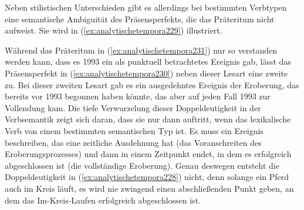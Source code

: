 Neben stilistischen Unterschieden gibt es allerdings bei bestimmten Verbtypen eine semantische Ambiguität des Präsensperfekts, die das Präteritum nicht aufweist.
Sie wird in (\ref{ex:analytischetempora229}) illustriert.


\begin{exe}
  \ex\label{ex:analytischetempora229}
  \begin{xlist}
  \end{xlist}
\end{exe}


\label{abs:analytischetempora232}Während das Präteritum in (\ref{ex:analytischetempora231}) nur so verstanden werden kann, dass es 1993 ein als punktuell betrachtetes Ereignis gab, lässt das Präsensperfekt in (\ref{ex:analytischetempora230}) neben dieser Lesart eine zweite zu.
Bei dieser zweiten Lesart gab es ein ausgedehntes Ereignis der Eroberung, das bereits vor 1993 begonnen haben könnte, das aber auf jeden Fall 1993 zur Vollendung kam.
Die tiefe Verwurzelung dieser Doppeldeutigkeit in der Verbsemantik zeigt sich daran, dass sie nur dann auftritt, wenn das lexikalische Verb von einem bestimmten semantischen Typ ist.
Es muss ein Ereignis beschreiben, das eine zeitliche Ausdehnung hat (\zB das Voranschreiten des Eroberungsprozesses) und dann in einem Zeitpunkt endet, in dem es erfolgreich abgeschlossen ist (die vollständige Eroberung).
Genau deswegen entsteht die Doppeldeutigkeit in (\ref{ex:analytischetempora228}) nicht, denn solange ein Pferd auch im Kreis läuft, es wird nie zwingend einen abschließenden Punkt geben, an dem das Im-Kreis-Laufen erfolgreich abgeschlossen ist.

